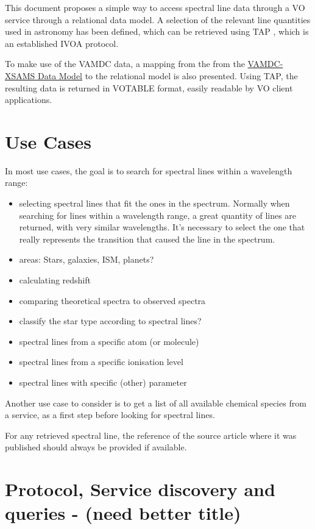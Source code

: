 \documentclass[11pt,a4paper]{ivoa}
\begin{document}
This document proposes a simple way to access spectral line data through a VO service through a relational data model. A selection of the relevant line quantities used in astronomy has been defined, which can be retrieved using TAP \citep{std:TAP}, which is an established IVOA protocol.

To make use of the VAMDC data, a mapping from the from the \href{https://standards.vamdc.eu/#data-model}{VAMDC-XSAMS Data Model} to the relational model is also presented. Using TAP, the resulting data is returned in VOTABLE format,  easily readable by VO client applications. 


\section{Use Cases}

In most use cases, the goal is to search for spectral lines within a wavelength range:

\begin{itemize}

\item selecting  spectral lines that fit the ones in the spectrum.
Normally when searching for lines within a wavelength range, a great quantity of lines are returned, with very similar wavelengths. It's necessary to select the one that really represents the transition that caused the line in the spectrum.
\item areas: Stars, galaxies, ISM, planets?
\item calculating redshift
\item comparing theoretical spectra to observed spectra
\item classify the star type according to spectral lines?
\item spectral lines from a specific atom (or molecule)
\item spectral lines from a specific ionisation level
\item spectral lines with specific (other) parameter
\end{itemize}

Another use case to consider is to get a list of all available chemical species 
from a service, as a first step before looking for spectral lines.

For any retrieved spectral line, the reference of the source article where it was published
should always be provided if available.

\section{Protocol, Service discovery and queries - (need better title)}
\end{document}
